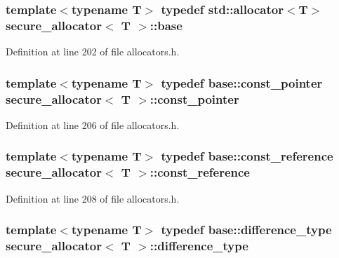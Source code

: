 \subsubsection[{base}]{\setlength{\rightskip}{0pt plus 5cm}template$<$typename T$>$ typedef std\+::allocator$<$T$>$ {\bf secure\+\_\+allocator}$<$ T $>$\+::{\bf base}}\label{structsecure__allocator_aecbe486abe3e32e35e3289e149bd2356}


Definition at line 202 of file allocators.\+h.

\hypertarget{structsecure__allocator_abf76dd1c45de47c15d7a8c53cb2d8ab9}{}
\subsubsection[{const\+\_\+pointer}]{\setlength{\rightskip}{0pt plus 5cm}template$<$typename T$>$ typedef base\+::const\+\_\+pointer {\bf secure\+\_\+allocator}$<$ T $>$\+::{\bf const\+\_\+pointer}}\label{structsecure__allocator_abf76dd1c45de47c15d7a8c53cb2d8ab9}


Definition at line 206 of file allocators.\+h.

\hypertarget{structsecure__allocator_a5ec58945b7a8010f7e8a77ebfd96ae8e}{}
\subsubsection[{const\+\_\+reference}]{\setlength{\rightskip}{0pt plus 5cm}template$<$typename T$>$ typedef base\+::const\+\_\+reference {\bf secure\+\_\+allocator}$<$ T $>$\+::{\bf const\+\_\+reference}}\label{structsecure__allocator_a5ec58945b7a8010f7e8a77ebfd96ae8e}


Definition at line 208 of file allocators.\+h.

\hypertarget{structsecure__allocator_a6ced0c166194ce9a266df10018cbb862}{}
\subsubsection[{difference\+\_\+type}]{\setlength{\rightskip}{0pt plus 5cm}template$<$typename T$>$ typedef base\+::difference\+\_\+type {\bf secure\+\_\+allocator}$<$ T $>$\+::{\bf difference\+\_\+type}}\label{structsecure__allocator_a6ced0c166194ce9a266df10018cbb862}


